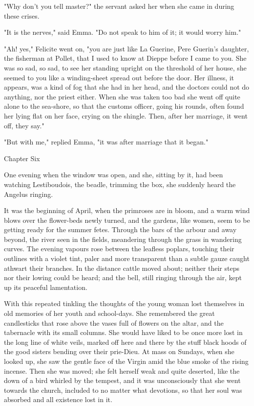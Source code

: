 \documentclass{tufte-book}
\begin{document}
"Why don't you tell master?" the servant asked her when she came in
during these crises.

"It is the nerves," said Emma. "Do not speak to him of it; it would
worry him."

"Ah! yes," Felicite went on, "you are just like La Guerine, Pere
Guerin's daughter, the fisherman at Pollet, that I used to know at
Dieppe before I came to you. She was so sad, so sad, to see her
standing upright on the threshold of her house, she seemed to you like a
winding-sheet spread out before the door. Her illness, it appears, was
a kind of fog that she had in her head, and the doctors could not do
anything, nor the priest either. When she was taken too bad she went
off quite alone to the sea-shore, so that the customs officer, going his
rounds, often found her lying flat on her face, crying on the shingle.
Then, after her marriage, it went off, they say."

"But with me," replied Emma, "it was after marriage that it began."



Chapter Six

One evening when the window was open, and she, sitting by it, had been
watching Lestiboudois, the beadle, trimming the box, she suddenly heard
the Angelus ringing.

It was the beginning of April, when the primroses are in bloom, and a
warm wind blows over the flower-beds newly turned, and the gardens, like
women, seem to be getting ready for the summer fetes. Through the bars
of the arbour and away beyond, the river seen in the fields, meandering
through the grass in wandering curves. The evening vapours rose between
the leafless poplars, touching their outlines with a violet tint, paler
and more transparent than a subtle gauze caught athwart their branches.
In the distance cattle moved about; neither their steps nor their lowing
could be heard; and the bell, still ringing through the air, kept up its
peaceful lamentation.

With this repeated tinkling the thoughts of the young woman lost
themselves in old memories of her youth and school-days. She remembered
the great candlesticks that rose above the vases full of flowers on the
altar, and the tabernacle with its small columns. She would have liked
to be once more lost in the long line of white veils, marked off here
and there by the stuff black hoods of the good sisters bending over
their prie-Dieu. At mass on Sundays, when she looked up, she saw the
gentle face of the Virgin amid the blue smoke of the rising incense.
Then she was moved; she felt herself weak and quite deserted, like the
down of a bird whirled by the tempest, and it was unconsciously that she
went towards the church, included to no matter what devotions, so that
her soul was absorbed and all existence lost in it.
\end{document}
